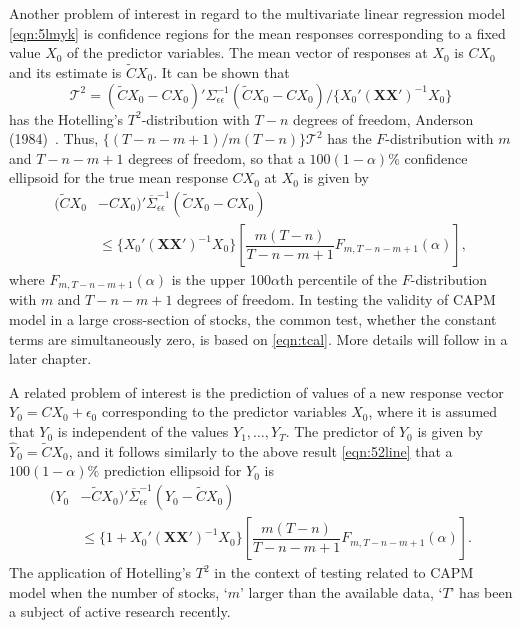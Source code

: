 Another problem of interest in regard to the multivariate linear regression model \eqref{eqn:5lmyk} is confidence regions for the mean responses corresponding to a fixed value $X_0$ of the predictor variables. The mean vector of responses at $X_0$ is $CX_0$ and its estimate is $\tilde{C}X_0$. It can be shown that
	\begin{equation} \label{eqn:tcal}
	\mathcal{T}^2= ( \tilde{C }X_0 - CX_0)' \Sigma_{\epsilon\epsilon}^{-1} (\tilde{C} X_0 - CX_0) / \{X_0'(\mathbf{X} \mathbf{X}')^{-1}X_0 \}
	\end{equation}
has the Hotelling's $T^2$-distribution with $T - n$ degrees of freedom, Anderson (1984)~\cite[Chap. 5]{andersontw2}. Thus, $\{(T - n - m + 1)/ m(T - n)\} \mathcal{T}^2$ has the $F$-distribution with $m$ and $T - n - m + 1$ degrees of freedom, so that a $100(1 - \alpha)\%$ confidence ellipsoid for the true mean response $CX_0$ at $X_0$ is given by 
	\begin{equation} \label{eqn:52line}
	\begin{split}
	(\tilde{C}X_0 & -CX_0)' \overline{\Sigma}_{\epsilon\epsilon}^{-1} (\tilde{C}X_0 - CX_0) \\
	&\leq \{X_0' (\mathbf{X}\mathbf{X}')^{-1} X_0\} \left[ \dfrac{m(T - n)}{T - n - m + 1} F_{m,T - n - m + 1}(\alpha) \right],
	 \end{split}
	\end{equation}
where $F_{m,T - n - m + 1}(\alpha)$ is the upper 100$\alpha$th percentile of the $F$-distribution with $m$ and $T - n - m + 1$ degrees of freedom. In testing the validity of CAPM model in a large cross-section of stocks, the common test, whether the constant terms are simultaneously zero, is based on \eqref{eqn:tcal}. More details will follow in a later chapter.


A related problem of interest is the prediction of values of a new response vector $Y_0= CX_0 + \epsilon_0$ corresponding to the predictor variables $X_0$, where it is assumed that $Y_0$ is independent of the values $Y_1, \ldots, Y_T$. The predictor of $Y_0$ is given by $\hat{Y}_0= \tilde{C}X_0$, and it follows similarly to the above result \eqref{eqn:52line} that a $100(1 - \alpha)\%$ prediction ellipsoid for $Y_0$ is
	\begin{equation} \label{eqn:52another2}
	\begin{split}
	(Y_0 & -\tilde{C}X_0)' \overline{\Sigma}_{\epsilon\epsilon}^{-1} (Y_0 - \tilde{C} X_0) \\
	&\leq \{1 + X_0'(\mathbf{X}\mathbf{X}')^{-1} X_0\} \left[ \dfrac{m(T - n)}{T - n - m + 1} F_{m,T - n - m + 1}(\alpha) \right].
	\end{split}
	\end{equation}
The application of Hotelling's $T^2$ in the context of testing related to CAPM model when the number of stocks, `$m$' larger than the available data, `$T$' has been a subject of active research recently. 



